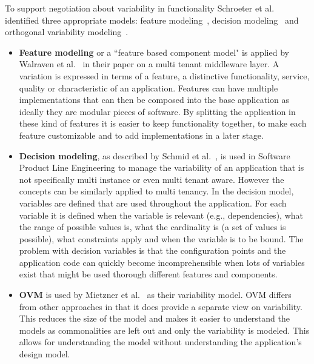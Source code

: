 To support negotiation about variability in functionality Schroeter et al.~\cite{schroeter2012towards} identified three appropriate models: feature modeling~\cite{benavides2010automated,kang1990feature}, decision modeling~\cite{schmid2004customizable,schmid2011comparison} and orthogonal variability modeling~\cite{lauenroth2005software,metzger2007disambiguating}.

\begin{itemize}
\item \textbf{Feature modeling} or a ``feature based component model" is applied by Walraven et al.~\cite{walraven2011middleware} in their paper on a multi tenant middleware layer. A variation is
expressed in terms of a feature, a distinctive functionality, service, quality or characteristic of an 
application. Features can have multiple implementations that can then be composed into the 
base application as ideally they are modular pieces of software. By splitting the application in 
these kind of features it is easier to keep functionality together, to make each feature 
customizable and to add implementations in a later stage.

\item \textbf{Decision modeling}, as described by Schmid et al.~\cite{schmid2004customizable}, is used in 
Software Product Line Engineering to manage the variability of an application that is not specifically 
multi instance or even multi tenant aware. However the concepts can be similarly applied to 
multi tenancy. In the decision model, variables are defined that are used throughout the 
application. For each variable it is defined when the variable is relevant (e.g., dependencies), 
what the range of possible values is, what the cardinality is (a set of values is possible), what 
constraints apply and when the variable is to be bound. The problem with decision variables is 
that the configuration points and the application code can quickly become incomprehensible 
when lots of variables exist that might be used thorough different features and components.

\item \textbf{\acf{OVM}} is used by Mietzner et al.~\cite{mietzner2009variability} as their variability model. \ac{OVM} differs from other approaches in that it does provide a separate view on variability. This reduces the size of the model and makes it easier to understand the models as commonalities are left out and only the variability is modeled. This allows for understanding the model without understanding the application's design model. 


\end{itemize}
